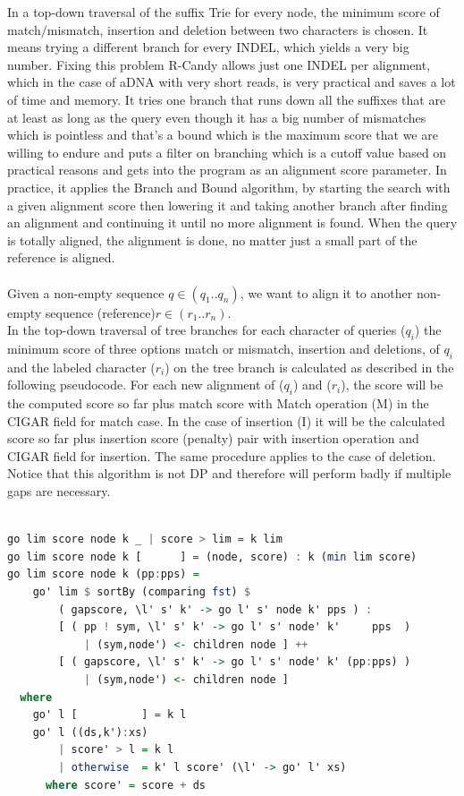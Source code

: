 \documentclass[11pt,a4paper]{report}
\begin{document}
In a top-down traversal of the suffix Trie for every node, the 
minimum score of match$/$mismatch, insertion and deletion between
two characters is chosen. It means trying a different branch for 
every INDEL, which yields a very big number. Fixing this problem 
R-Candy allows just one INDEL per alignment, which in the case
of aDNA with very short reads, is very practical and saves a lot of
time and memory. It tries one branch that runs down all the suffixes
that are at least as long as the query even though it has a big 
number of mismatches which is pointless and that's a bound which is
the maximum score that we are willing to endure and puts a filter on
branching which is a cutoff value based on practical reasons and gets
into the program as an alignment score parameter. 
In practice, it applies the Branch and Bound algorithm, by starting the 
search  with a given alignment score then lowering it and taking another 
branch after finding an alignment and continuing it until no more 
alignment is found. When the query is totally aligned, the alignment is 
done, no matter just a small part of the reference is aligned.
\\\\
Given a non-empty sequence $q\in (q_{1}..q_{n})$, we want to align it to 
another non-empty sequence (reference)$r\in (r_{1}..r_{n})$.\\
In the top-down traversal of tree branches for each character 
of queries ($q_{i}$) the minimum score of three options match or mismatch, 
insertion and deletions, of $q_{i}$  and the labeled character ($r_{i}$)
on the tree branch is calculated as described in the following pseudocode.
For each new alignment of ($q_{i}$) and ($r_{i}$), the score will be the
computed score so far plus match score with Match operation (M) in the 
CIGAR field \cite{samtools} for match case. In the case of insertion (I) 
it will be the calculated score so far plus insertion score (penalty) pair 
with insertion operation and CIGAR field for insertion.
The same procedure applies to the case of deletion.
Notice that this algorithm is not DP and therefore will
perform badly if multiple gaps are necessary.\\


\begin{lstlisting}[language=Haskell, basicstyle=\ttfamily\scriptsize, 
keywordstyle=\color{red}, frame=single ]

go lim score node k _ | score > lim = k lim
go lim score node k [      ] = (node, score) : k (min lim score)
go lim score node k (pp:pps) =
    go' lim $ sortBy (comparing fst) $
        ( gapscore, \l' s' k' -> go l' s' node k' pps ) :                   
        [ ( pp ! sym, \l' s' k' -> go l' s' node' k'     pps  )
            | (sym,node') <- children node ] ++
        [ ( gapscore, \l' s' k' -> go l' s' node' k' (pp:pps) ) 
            | (sym,node') <- children node ]
  where
    go' l [          ] = k l
    go' l ((ds,k'):xs)
        | score' > l = k l               
        | otherwise  = k' l score' (\l' -> go' l' xs)
      where score' = score + ds

\end{lstlisting}
\end{document}
